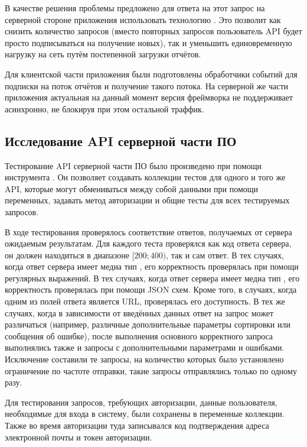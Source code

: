 \tab
В качестве решения проблемы предложено для ответа на этот запрос на серверной стороне приложения использовать технологию .
Это позволит как снизить количество запросов (вместо повторных запросов пользователь API будет просто подписываться на получение новых), так и уменьшить единовременную нагрузку на сеть путём постепенной загрузки отчётов.

\tab
Для клиентской части приложения были подготовлены обработчики событий для подписки на поток отчётов и получение такого потока.
На серверной же части приложения актуальная на данный момент версия фреймворка  не поддерживает  асинхронно, не блокируя при этом остальной траффик.

\subsection{Исследование API серверной части ПО}

\tab
Тестирование API серверной части ПО было произведено при помощи инструмента \cite{postman}.
Он позволяет создавать коллекции тестов для одного и того же API, которые могут обмениваться между собой данными при помощи переменных, задавать метод авторизации и общие тесты для всех тестируемых запросов.

\tab
В ходе тестирования проверялось соответствие ответов, получаемых от сервера ожидаемым результатам. Для каждого теста проверялся как код ответа сервера, он должен находиться в диапазоне $[200; 400)$, так и сам ответ.
В тех случаях, когда ответ сервера имеет медиа тип , его корректность проверялась при помощи регулярных выражений. В тех случаях, когда ответ сервера имеет медиа тип , его корректность проверялась при помощи JSON схем.
Кроме того, в случаях, когда одним из полей ответа является URL, проверялась его доступность.
В тех же случаях, когда в зависимости от введённых данных ответ на запрос может различаться (например, различные дополнительные параметры сортировки или сообщения об ошибке), после выполнения основного корректного запроса выполнялись также и запросы с дополнительными параметрами и ошибками.
Исключение составили те запросы, на количество которых было установлено ограничение по частоте отправки, такие запросы отправлялись только по одному разу.

\tab
Для тестирования запросов, требующих авторизации, данные пользователя, необходимые для входа в систему, были сохранены в переменные коллекции.
Также во время авторизации туда записывался код подтверждения адреса электронной почты и токен авторизации.

